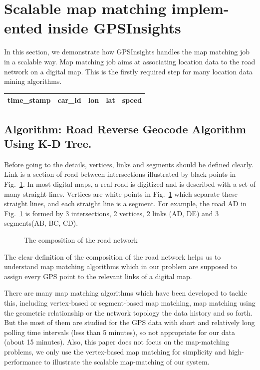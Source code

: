 \documentclass{acm_proc_article-sp}
\begin{document}
\section{Scalable map matching implem-ented inside GPSInsights}

In this section, we demonstrate how GPSInsights handles the map matching job in a scalable way. Map matching job aims at associating location data to the road network on a digital map. This is the firstly required step for many location data mining algorithms. 

\begin{table}[h]
\centering
\begin{tabular}{|c|c|c|c|c|}
\hline
\textbf{time\_stamp} & \textbf{car\_id} & \textbf{lon}   & \textbf{lat} & \textbf{speed} \\ \hline
\end{tabular}
\end{table}

\subsection{Algorithm: Road Reverse Geocode Algorithm Using K-D Tree.}	
Before going to the details, vertices, links and segments should be defined clearly. Link is a section of road between intersections illustrated by black points in Fig.~\ref{fig:composition}. In most digital maps, a real road is digitized and is described with a set of many straight lines. Vertices are white points in Fig.~\ref{fig:composition} which separate these straight lines, and each straight line is a segment. For example, the road AD in Fig.~\ref{fig:composition} is formed by 3 intersections, 2 vertices, 2 links (AD, DE) and 3 segments(AB, BC, CD).
		
\begin{figure}[h]
\centering
{}
\caption{The composition of the road network}
\label{fig:composition}
\end{figure}

The clear definition of the composition of the road network helps us to understand map matching algorithms which in our problem are supposed to assign every GPS point to the relevant links of a digital map.

There are many map matching algorithms which have been developed to tackle this, including vertex-based or segment-based map matching, map matching using the geometric relationship or the network topology the data history and so forth. But the most of them are studied for the GPS data with short and relatively long polling time intervals (less than 5 minutes), so not appropriate for our data (about 15 minutes). Also, this paper does not focus on the map-matching problems, we only use the vertex-based map matching for simplicity and high-performance to illustrate the scalable map-matching of our system.
\end{document}
